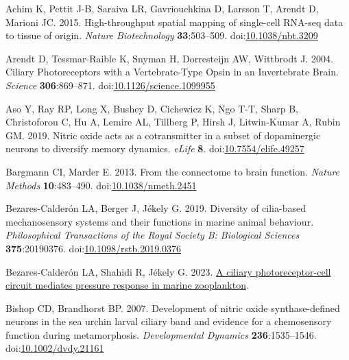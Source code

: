 \documentclass[
  10pt,
  onecolumn]{article}
\newlength{\cslhangindent}
\newlength{\cslentryspacingunit} %
\newenvironment{CSLReferences}[2] %
 {%
  \setlength{\parindent}{0pt}
  \ifodd #1
  \let\oldpar\par
  \def\par{\hangindent=\cslhangindent\oldpar}
  \fi
  \setlength{\parskip}{#2\cslentryspacingunit}
 }%
 {}
\begin{document}
\hypertarget{refs}{}
\begin{CSLReferences}{1}{0}
\leavevmode{}%
Achim K, Pettit J-B, Saraiva LR, Gavriouchkina D, Larsson T, Arendt D,
Marioni JC. 2015. High-throughput spatial mapping of single-cell RNA-seq
data to tissue of origin. \emph{Nature Biotechnology}
\textbf{33}:503--509.
doi:\href{https://doi.org/10.1038/nbt.3209}{10.1038/nbt.3209}

\leavevmode{}%
Arendt D, Tessmar-Raible K, Snyman H, Dorresteijn AW, Wittbrodt J. 2004.
Ciliary Photoreceptors with a Vertebrate-Type Opsin in an Invertebrate
Brain. \emph{Science} \textbf{306}:869--871.
doi:\href{https://doi.org/10.1126/science.1099955}{10.1126/science.1099955}

\leavevmode{}%
Aso Y, Ray RP, Long X, Bushey D, Cichewicz K, Ngo T-T, Sharp B,
Christoforou C, Hu A, Lemire AL, Tillberg P, Hirsh J, Litwin-Kumar A,
Rubin GM. 2019. Nitric oxide acts as a cotransmitter in a subset of
dopaminergic neurons to diversify memory dynamics. \emph{eLife}
\textbf{8}.
doi:\href{https://doi.org/10.7554/elife.49257}{10.7554/elife.49257}

\leavevmode{}%
Bargmann CI, Marder E. 2013. From the connectome to brain function.
\emph{Nature Methods} \textbf{10}:483--490.
doi:\href{https://doi.org/10.1038/nmeth.2451}{10.1038/nmeth.2451}

\leavevmode{}%
Bezares-Calderón LA, Berger J, Jékely G. 2019. Diversity of cilia-based
mechanosensory systems and their functions in marine animal behaviour.
\emph{Philosophical Transactions of the Royal Society B: Biological
Sciences} \textbf{375}:20190376.
doi:\href{https://doi.org/10.1098/rstb.2019.0376}{10.1098/rstb.2019.0376}

\leavevmode{}%
Bezares-Calderón LA, Shahidi R, Jékely G. 2023.
\href{http://dx.doi.org/10.1101/2023.02.28.530398}{A ciliary
photoreceptor-cell circuit mediates pressure response in marine
zooplankton}.

\leavevmode{}%
Bishop CD, Brandhorst BP. 2007. Development of nitric oxide
synthase-defined neurons in the sea urchin larval ciliary band and
evidence for a chemosensory function during metamorphosis.
\emph{Developmental Dynamics} \textbf{236}:1535--1546.
doi:\href{https://doi.org/10.1002/dvdy.21161}{10.1002/dvdy.21161}


\end{CSLReferences}
\end{document}

